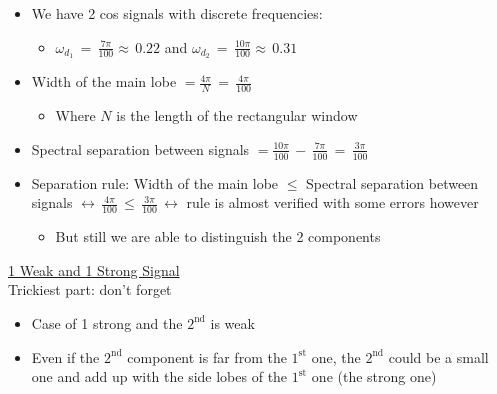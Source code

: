 \begin{itemize}

\item We have 2 cos signals with discrete frequencies:

	\begin{itemize}
	\item $ \omega_{d_1} \, = \, \displaystyle\frac{7 \pi}{100} \approx \, 0.22$ and $ \omega_{d_2} \, = \, \displaystyle\frac{10 \pi}{100} \approx \, 0.31$ 
	
	
	\end{itemize}

\item Width of the main lobe $ = \displaystyle\frac{4 \pi}{N} \, = \, \displaystyle\frac{4 \pi}{100}$

	\begin{itemize}
	\item Where $N$ is the length of the rectangular window
	\end{itemize}

\item Spectral separation between signals $= \displaystyle\frac{10 \pi}{100} \, - \, \displaystyle\frac{7 \pi}{100} \, = \, \displaystyle\frac{3 \pi}{100}$

\item Separation rule: Width of the main lobe $\leq$ Spectral separation between signals $\leftrightarrow \,\displaystyle\frac{4 \pi}{100} \,\leq \,  \displaystyle\frac{3 \pi}{100} \, \leftrightarrow$ rule is almost verified with some errors however

	\begin{itemize}
	\item  But still we are able to distinguish the 2 components
	\end{itemize}
	
\end{itemize}

\underline{1 Weak and 1 Strong Signal}\\

Trickiest part: don't forget 

\begin{itemize}
	
\item Case of 1 strong and the $\mathrm{2}^\mathrm{nd}$ is weak
	
\item Even if the $\mathrm{2}^\mathrm{nd}$ component is far from the $\mathrm{1}^\mathrm{st}$ one, the $\mathrm{2}^\mathrm{nd}$ could be a small one and add up with the side lobes of the $\mathrm{1}^\mathrm{st}$ one (the strong one)

\end{itemize}


